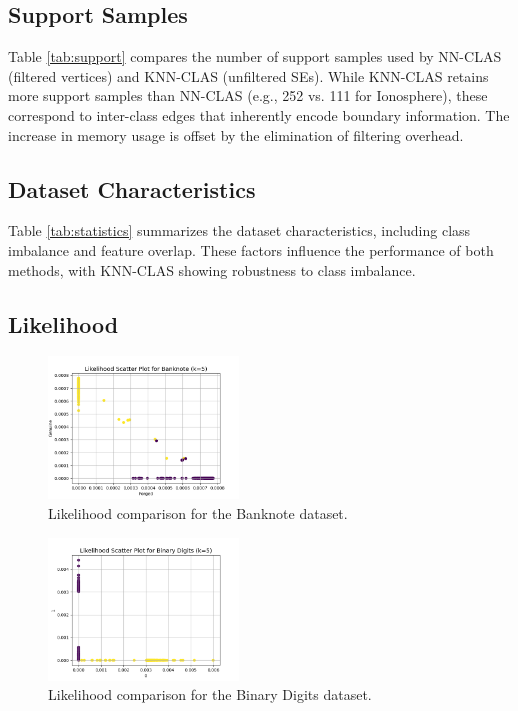 \documentclass[conference]{IEEEtran}
\begin{document}
\subsection{Support Samples}

Table \ref{tab:support} compares the number of support samples used by NN-CLAS (filtered vertices) and KNN-CLAS (unfiltered SEs). While KNN-CLAS retains more support samples than NN-CLAS (e.g., 252 vs. 111 for Ionosphere), these correspond to inter-class edges that inherently encode boundary information. The increase in memory usage is offset by the elimination of filtering overhead.

\subsection{Dataset Characteristics}

Table \ref{tab:statistics} summarizes the dataset characteristics, including class imbalance and feature overlap. These factors influence the performance of both methods, with KNN-CLAS showing robustness to class imbalance.

\subsection{Likelihood}

\begin{figure}[htbp]
    \centering
    \includegraphics[width=0.45\textwidth]{../scripts/comparison_results/Banknote_likelihood.png}
    \caption{Likelihood comparison for the Banknote dataset.}
    \label{fig:banknote_likelihood}
\end{figure}

\begin{figure}[htbp]
    \centering
    \includegraphics[width=0.45\textwidth]{../scripts/comparison_results/Binary Digits_likelihood.png}
    \caption{Likelihood comparison for the Binary Digits dataset.}
    \label{fig:binary_digits_likelihood}
\end{figure}
\end{document}
